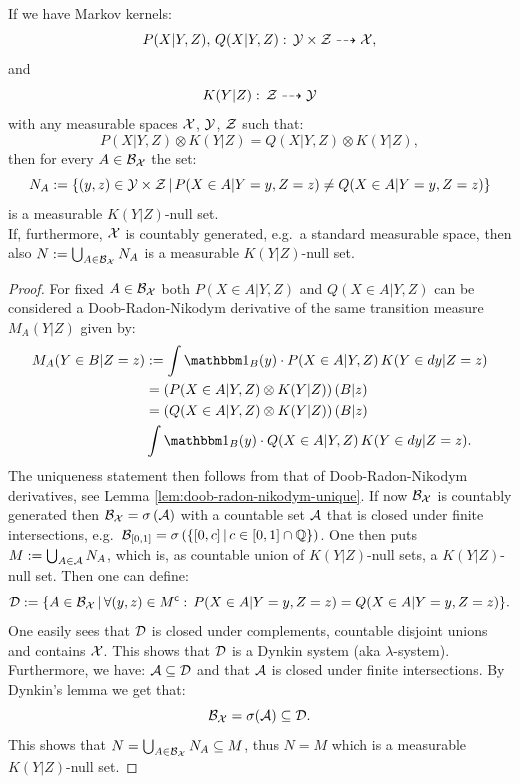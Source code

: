 \begin{Lem}
    \label{ess-unique}
    If we have Markov kernels:    
    \[P(X|Y,Z),\,Q(X|Y,Z):\, \mathcal{Y}\times \mathcal{Z} \dashrightarrow \mathcal{X},\]
    and 
    \[K(Y|Z):\,\mathcal{Z} \dashrightarrow \mathcal{Y}\]
    with any measurable spaces $\mathcal{X}$, $\mathcal{Y}$, $\mathcal{Z}$ such that:
    \[ P(X|Y,Z) \otimes K(Y|Z) = Q(X|Y,Z) \otimes K(Y|Z), \]
    then for every $A \in \mathcal{B}_{\mathcal{X}}$ the set:
    \[N_A := \left \{ (y,z) \in \mathcal{Y} \times \mathcal{Z} \,|\, P(X \in A|Y=y,Z=z) \neq Q(X \in A|Y=y,Z=z)\right \}\]
     is a measurable $K(Y|Z)$-null set. \\
     If, furthermore, $\mathcal{X}$ is countably generated, e.g.\ a standard measurable space,
     then also $N := \bigcup_{A \in \mathcal{B}_{\mathcal{X}}} N_A$ is a measurable $K(Y|Z)$-null set.
     \begin{proof}
         For fixed $A \in \mathcal{B}_{\mathcal{X}}$ both $P(X \in A|Y,Z)$ and $Q(X \in A|Y,Z)$ can be considered
         a Doob-Radon-Nikodym derivative of the same transition measure $M_A(Y|Z)$ given by:
         \begin{align*} M_A(Y \in B|Z=z)&:= \int \I_B(y) \cdot P(X \in A|Y,Z)\, K(Y \in dy|Z=z) \\
             & = \lp P(X \in A|Y,Z) \otimes K(Y|Z) \rp(B|z) \\
             & = \lp Q(X \in A|Y,Z) \otimes K(Y|Z) \rp(B|z) \\
             &\int \I_B(y) \cdot Q(X \in A|Y,Z)\, K(Y \in dy|Z=z).
         \end{align*}
         The uniqueness statement then follows from that of Doob-Radon-Nikodym derivatives, see Lemma \ref{lem:doob-radon-nikodym-unique}.
         If now $\mathcal{B}_{\mathcal{X}}$ is countably generated then $\mathcal{B}_{\mathcal{X}} =\sigma\left ( \mathcal{A}\right )$ 
         with a countable set $\mathcal{A}$ that is closed under finite intersections, e.g.\ 
         $\mathcal{B}_{[0,1]}=\sigma\left (\left \{[0,c]\,|\, c \in [0,1] \cap \mathbb{Q}\right \}\right )$. 
         One then puts $M:=\bigcup_{A \in \mathcal{A}} N_A$, which is, as countable union of $K(Y|Z)$-null sets, a $K(Y|Z)$-null set.
         Then one can define:
         \[ \mathcal{D} := \{ A \in \mathcal{B}_{\mathcal{X}} \,|\, \forall (y,z) \in M^{\mathsf{c}}:\, P(X \in A|Y=y,Z=z)=Q(X \in A|Y=y,Z=z) \}.\]
         One easily sees that $\mathcal{D}$ is closed under complements, countable disjoint unions and contains $\mathcal{X}$.
         This shows that $\mathcal{D}$ is a Dynkin system (aka $\lambda$-system).
         Furthermore, we have: $\mathcal{A} \subseteq \mathcal{D}$ and that $\mathcal{A}$ is closed under finite intersections. 
         By Dynkin's lemma we get that:
         \[\mathcal{B}_{\mathcal{X}} = \sigma(\mathcal{A}) \subseteq \mathcal{D}.\]
         This shows that $N = \bigcup_{A \in \mathcal{B}_{\mathcal{X}}}N_A \subseteq M$, thus $N = M$ which is a measurable $K(Y|Z)$-null set.
     \end{proof}
 \end{Lem}

